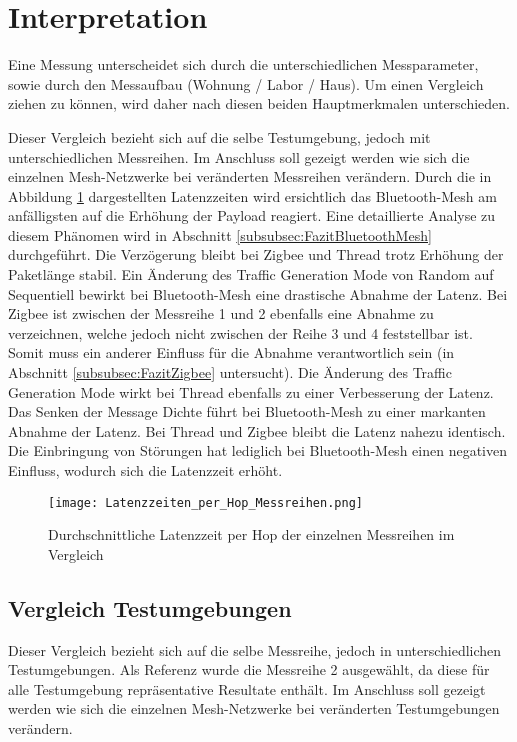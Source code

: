 \clearpage
\section{Interpretation}\label{sec:Interpretation}
Eine Messung unterscheidet sich durch die unterschiedlichen Messparameter, sowie durch den Messaufbau (Wohnung / Labor / Haus). Um einen Vergleich ziehen zu können, wird daher nach diesen beiden Hauptmerkmalen unterschieden.

Dieser Vergleich bezieht sich auf die selbe Testumgebung, jedoch mit unterschiedlichen Messreihen. Im Anschluss soll gezeigt werden wie sich die einzelnen Mesh-Netzwerke bei veränderten Messreihen verändern. Durch die in Abbildung \ref{fig:Latenzzeiten_per_Hop_Messreihen} dargestellten Latenzzeiten wird ersichtlich das Bluetooth-Mesh am anfälligsten auf die Erhöhung der Payload reagiert. Eine detaillierte Analyse zu diesem Phänomen wird in Abschnitt \ref{subsubsec:FazitBluetoothMesh} durchgeführt. Die Verzögerung bleibt bei Zigbee und Thread trotz Erhöhung der Paketlänge stabil. Ein Änderung des Traffic Generation Mode von Random auf Sequentiell bewirkt bei Bluetooth-Mesh eine drastische Abnahme der Latenz. Bei Zigbee ist zwischen der Messreihe 1 und 2 ebenfalls eine Abnahme zu verzeichnen, welche jedoch nicht zwischen der Reihe 3 und 4 feststellbar ist. Somit muss ein anderer Einfluss für die Abnahme verantwortlich sein (in Abschnitt \ref{subsubsec:FazitZigbee} untersucht). Die Änderung des Traffic Generation Mode wirkt bei Thread ebenfalls zu einer Verbesserung der Latenz. Das Senken der Message Dichte führt bei Bluetooth-Mesh zu einer markanten Abnahme der Latenz. Bei Thread und Zigbee bleibt die Latenz nahezu identisch. Die Einbringung von Störungen hat lediglich bei Bluetooth-Mesh einen negativen Einfluss, wodurch sich die Latenzzeit erhöht. 

\begin{figure}[H]
	\centering
	\texttt{[image: Latenzzeiten\_per\_Hop\_Messreihen.png]}
	\caption{Durchschnittliche Latenzzeit per Hop der einzelnen Messreihen im Vergleich}\label{fig:Latenzzeiten_per_Hop_Messreihen}
\end{figure}

\newpage
\subsection{Vergleich Testumgebungen}\label{subsec:VergleichTestumgebungen}
Dieser Vergleich bezieht sich auf die selbe Messreihe, jedoch in unterschiedlichen Testumgebungen. Als Referenz wurde die Messreihe 2 ausgewählt, da diese für alle Testumgebung repräsentative Resultate enthält. Im Anschluss soll gezeigt werden wie sich die einzelnen Mesh-Netzwerke bei veränderten Testumgebungen verändern.

